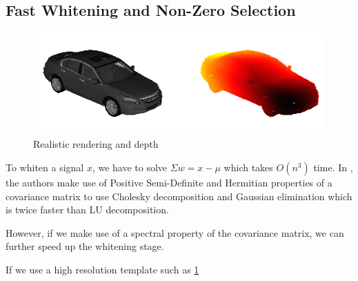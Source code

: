 \documentclass[10pt,twocolumn,letterpaper]{article}
\begin{document}
\subsection{Fast Whitening and Non-Zero Selection}

\begin{figure}[t]
  \begin{center}
     \includegraphics[width=0.9\linewidth]{whiten_orig_depth} 
  \end{center}
  \caption{Realistic rendering and depth}
  \label{fig:rendering}
  \end{figure}
 
To whiten a signal $x$, we have to solve $\Sigma w = x - \mu$ which takes $O(n^3)$ time. In \cite{Hariharan12}, the authors make use of Positive Semi-Definite and Hermitian properties of a covariance matrix to use Cholesky decomposition and Gaussian elimination which is twice faster than LU decomposition.

However, if we make use of a spectral property of the covariance matrix, we can further speed up the whitening stage.
  
  If we use a high resolution template such as \ref{fig:rendering}


\end{document}
